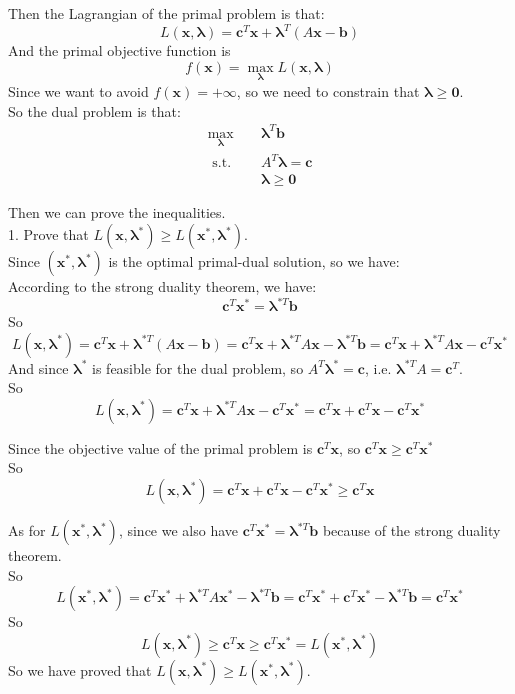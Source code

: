 \documentclass[10pt]{article}
\begin{document}
Then the Lagrangian of the primal problem is that:
$$L(\bm{x},\bm{\lambda}) = \bm{c}^T\bm{x} + \bm{\lambda}^T(A\bm{x} - \bm{b})$$
And the primal objective function is
$$f(\bm{x}) = \max\limits_{\bm{\lambda}} L(\bm{x},\bm{\lambda})$$
Since we want to avoid $f(\bm{x})=+\infty$, so we need to constrain that $\bm{\lambda}\geq \bm{0}$.\\
So the dual problem is that:
\begin{equation}
\begin{aligned}
\max_{\bm{\lambda}} \quad & \bm{\lambda}^T\bm{b} \\
\text { s.t. } \quad & A^T\bm{\lambda} = \bm{c} \\
& \bm{\lambda} \geq \bm{0}
\end{aligned}
\end{equation}

Then we can prove the inequalities.\\
1. Prove that $L(\bm{x}, \bm{\lambda}^*) \geq L(\bm{x}^*, \bm{\lambda}^*)$.\\
Since $(\bm{x}^*, \bm{\lambda}^*)$ is the optimal primal-dual solution, so we have:\\
According to the strong duality theorem, we have:
$$\bm{c}^T\bm{x}^* = \bm{\lambda}^{*T}\bm{b}$$
So
$$L(\bm{x}, \bm{\lambda}^*)=\bm{c}^T\bm{x} + \bm{\lambda}^{*T}(A\bm{x} - \bm{b})=\bm{c}^T\bm{x} + \bm{\lambda}^{*T}A\bm{x} - \bm{\lambda}^{*T}\bm{b}=\bm{c}^T\bm{x} + \bm{\lambda}^{*T}A\bm{x} - \bm{c}^{T}\bm{x}^*$$
And since $\bm{\lambda}^*$ is feasible for the dual problem, so $A^T\bm{\lambda}^* = \bm{c}$, i.e. $\bm{\lambda}^{*T}A = \bm{c}^T$.\\
So
$$L(\bm{x},\bm{\lambda}^*)=\bm{c}^T\bm{x} + \bm{\lambda}^{*T}A\bm{x} - \bm{c}^{T}\bm{x}^*=\bm{c}^T\bm{x} + \bm{c}^T\bm{x} - \bm{c}^T\bm{x}^* $$
















Since the objective value of the primal problem is $\bm{c}^T\bm{x}$, so $\bm{c}^T\bm{x}\geq\bm{c}^T\bm{x}^*$\\
So
$$L(\bm{x},\bm{\lambda}^*)=\bm{c}^T\bm{x} + \bm{c}^T\bm{x} - \bm{c}^T\bm{x}^*\geq \bm{c}^T\bm{x}$$

As for $L(\bm{x}^*,\bm{\lambda}^*)$, since we also have $\bm{c}^T\bm{x}^* = \bm{\lambda}^{*T}\bm{b}$ because of the strong duality theorem.\\
So
$$L(\bm{x}^*, \bm{\lambda}^*)=\bm{c}^T\bm{x}^* + \bm{\lambda}^{*T}A\bm{x}^* - \bm{\lambda}^{*T}\bm{b}=\bm{c}^T\bm{x}^* + \bm{c}^T\bm{x}^* - \bm{\lambda}^{*T}\bm{b}=\bm{c}^T\bm{x}^*$$
So
$$L(\bm{x},\bm{\lambda}^*)\geq \bm{c}^T\bm{x}\geq \bm{c}^T\bm{x}^*=L(\bm{x}^*, \bm{\lambda}^*)$$
So we have proved that $L(\bm{x}, \bm{\lambda}^*) \geq L(\bm{x}^*, \bm{\lambda}^*)$.\\
\end{document}

